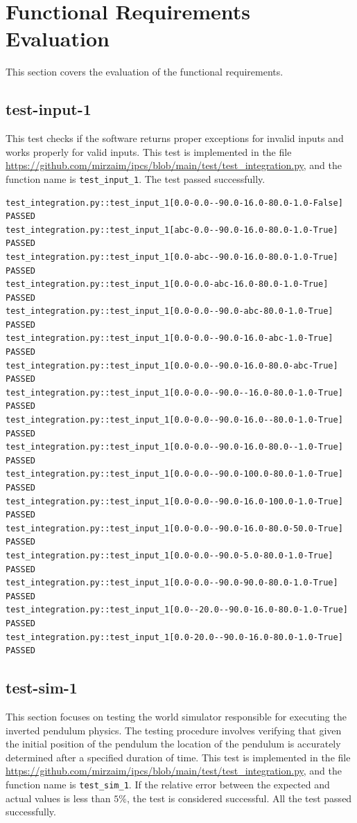\documentclass[12pt, titlepage]{article}
\begin{document}
\section{Functional Requirements Evaluation}
This section covers the evaluation of the functional requirements.

\subsection{test-input-1}
This test checks if the software returns proper exceptions for invalid inputs 
and works properly for valid inputs. This test is implemented in 
the file \url{https://github.com/mirzaim/ipcs/blob/main/test/test_integration.py}, 
and the function name is \texttt{test\_input\_1}. The test passed successfully.

\begin{small}
  \begin{verbatim}
test_integration.py::test_input_1[0.0-0.0--90.0-16.0-80.0-1.0-False]  PASSED
test_integration.py::test_input_1[abc-0.0--90.0-16.0-80.0-1.0-True]   PASSED 
test_integration.py::test_input_1[0.0-abc--90.0-16.0-80.0-1.0-True]   PASSED 
test_integration.py::test_input_1[0.0-0.0-abc-16.0-80.0-1.0-True]     PASSED   
test_integration.py::test_input_1[0.0-0.0--90.0-abc-80.0-1.0-True]    PASSED  
test_integration.py::test_input_1[0.0-0.0--90.0-16.0-abc-1.0-True]    PASSED  
test_integration.py::test_input_1[0.0-0.0--90.0-16.0-80.0-abc-True]   PASSED 
test_integration.py::test_input_1[0.0-0.0--90.0--16.0-80.0-1.0-True]  PASSED
test_integration.py::test_input_1[0.0-0.0--90.0-16.0--80.0-1.0-True]  PASSED
test_integration.py::test_input_1[0.0-0.0--90.0-16.0-80.0--1.0-True]  PASSED
test_integration.py::test_input_1[0.0-0.0--90.0-100.0-80.0-1.0-True]  PASSED
test_integration.py::test_input_1[0.0-0.0--90.0-16.0-100.0-1.0-True]  PASSED
test_integration.py::test_input_1[0.0-0.0--90.0-16.0-80.0-50.0-True]  PASSED
test_integration.py::test_input_1[0.0-0.0--90.0-5.0-80.0-1.0-True]    PASSED  
test_integration.py::test_input_1[0.0-0.0--90.0-90.0-80.0-1.0-True]   PASSED 
test_integration.py::test_input_1[0.0--20.0--90.0-16.0-80.0-1.0-True] PASSED
test_integration.py::test_input_1[0.0-20.0--90.0-16.0-80.0-1.0-True]  PASSED
  \end{verbatim}
\end{small}

\subsection{test-sim-1}
This section focuses on testing the world simulator responsible for 
executing the inverted pendulum physics. 
The testing procedure involves verifying that given the initial 
position of the pendulum the location of the pendulum is accurately 
determined after a specified duration of time.
This test is implemented in 
the file \url{https://github.com/mirzaim/ipcs/blob/main/test/test_integration.py}, 
and the function name is \texttt{test\_sim\_1}. If the relative error
between the expected and actual values is less than $5\%$, the test is considered
successful. All the test passed successfully.
\end{document}
